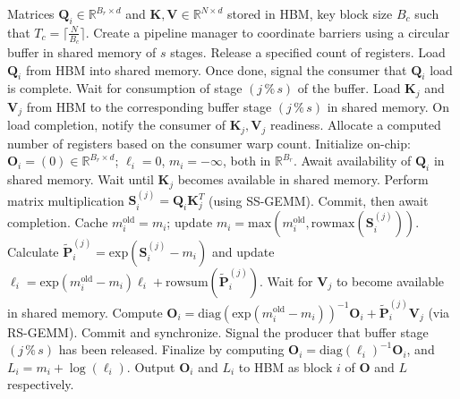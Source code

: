 \begin{enumerate}
\begin{algorithm}[H]
    \caption{\small\label{alg:flash3_wgmma_ws_only}\textsc{FlashAttention-3} forward pass \textbf{excluding} intra-consumer overlap -- CTA view}
    \begin{algorithmic}[1]
\REQUIRE Matrices $\mathbf{Q}_i \in \mathbb{R}^{B_r \times d}$ and $\mathbf{K}, \mathbf{V} \in \mathbb{R}^{N \times d}$ stored in HBM, key block size $B_c$ such that $T_c = \lceil \frac{N}{B_c} \rceil$.
\STATE Create a pipeline manager to coordinate barriers using a circular buffer in shared memory of $s$ stages.
\STATE Release a specified count of registers.
\STATE Load $\mathbf{Q}_i$ from HBM into shared memory.
\STATE Once done, signal the consumer that $\mathbf{Q}_i$ load is complete.
    \STATE Wait for consumption of stage $(j\,\%\,s)$ of the buffer.
    \STATE Load $\mathbf{K}_j$ and $\mathbf{V}_j$ from HBM to the corresponding buffer stage $(j\,\%\,s)$ in shared memory.
    \STATE On load completion, notify the consumer of $\mathbf{K}_j, \mathbf{V}_j$ readiness.
\ENDFOR
\ELSE \STATE Allocate a computed number of registers based on the consumer warp count.
\STATE Initialize on-chip: $\mathbf{O}_i = (0) \in \mathbb{R}^{B_r \times d}$; $\ell_i = 0$, $m_i = -\infty$, both in $\mathbb{R}^{B_r}$.
\STATE Await availability of $\mathbf{Q}_i$ in shared memory.
\STATE Wait until $\mathbf{K}_j$ becomes available in shared memory.
\STATE Perform matrix multiplication $\mathbf{S}_i^{(j)} = \mathbf{Q}_i \mathbf{K}_j^T$ (using SS-GEMM). Commit, then await completion. \label{alg:ws_only_gemm1}
\STATE Cache $m_i^{\mathrm{old}} = m_i$; update $m_i = \mathrm{max}(m_i^{\mathrm{old}}, \mathrm{rowmax}(\mathbf{S}_i^{(j)}))$. \label{code-ws:softmax_start}
\STATE Calculate $\widetilde{\mathbf{P}}_i^{(j)} = \mathrm{exp}(\mathbf{S}_i^{(j)} - m_i)$ and update $\ell_i = \mathrm{exp}(m_i^{\mathrm{old}} - m_i) \ell_i + \mathrm{rowsum}(\widetilde{\mathbf{P}}_i^{(j)})$. \label{code-ws:softmax_end}
\STATE Wait for $\mathbf{V}_j$ to become available in shared memory.
\STATE Compute $\mathbf{O}_i = \mathrm{diag}(\mathrm{exp}(m_i^{\mathrm{old}} - m_i))^{-1} \mathbf{O}_i + \widetilde{\mathbf{P}}_i^{(j)} \mathbf{V}_j$ (via RS-GEMM). Commit and synchronize. \label{alg:ws_only_gemm2}
\STATE Signal the producer that buffer stage $(j\,\%\,s)$ has been released.
\ENDFOR
\STATE Finalize by computing $\mathbf{O}_i = \mathrm{diag}(\ell_i)^{-1} \mathbf{O}_i$, and $L_i = m_i + \log(\ell_i)$.
\STATE Output $\mathbf{O}_i$ and $L_i$ to HBM as block $i$ of $\mathbf{O}$ and $L$ respectively.
\ENDIF
\end{algorithmic}
\end{algorithm}


\end{enumerate}
